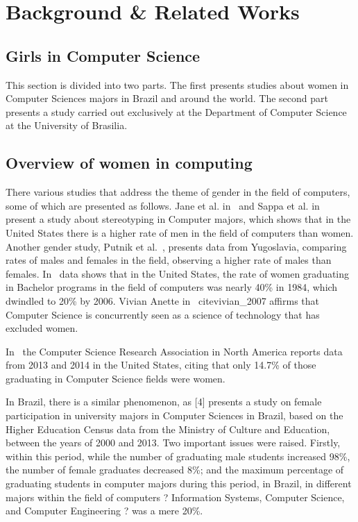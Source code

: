 \section{Background \& Related Works}\label{sec:background}%

\subsection{Girls in Computer Science}\label{subsec:background:girls}%
This section is divided into two parts. The first presents studies about women in Computer Sciences majors in Brazil and around the world. The second part presents a study carried out exclusively at the Department of Computer Science at the University of Brasilia.

\subsection{Overview of women in computing }
There various studies that address the theme of gender in the field of computers, some of which are presented as follows.
Jane et al. in~\cite{jane_2016} and Sappa et al. in~\cite{sappa_2013} present a study about stereotyping in Computer majors, which shows that in the United States there is a higher rate of men in the field of computers than women. Another gender study, Putnik et al.~\cite{zoran_2017}, presents data from Yugoslavia, comparing rates of males and females in the field, observing a higher rate of males than females. In~\cite{keinan_2017,moshe_2015} data shows that in the United States, the rate of women graduating in Bachelor programs in the field of computers was nearly 40\% in 1984, which dwindled to 20\% by 2006. Vivian Anette in ~cite{vivian_2007} affirms that Computer Science is concurrently seen as a science of technology that has excluded women.

In~\cite{moshe_2015}  the Computer Science Research Association in North America reports data from 2013 and 2014 in the United States, citing that only 14.7\% of those graduating in Computer Science fields were women.

In Brazil, there is a similar phenomenon, as [4] presents a study on female participation in university majors in Computer Sciences in Brazil, based on the Higher Education Census data from the Ministry of Culture and Education, between the years of 2000 and 2013. Two important issues were raised. Firstly, within this period, while the number of graduating male students increased 98\%, the number of female graduates decreased 8\%; and the maximum percentage of graduating students in computer majors during this period, in Brazil, in different majors within the field of computers ? Information Systems, Computer Science, and Computer Engineering ? was a mere 20\%.


